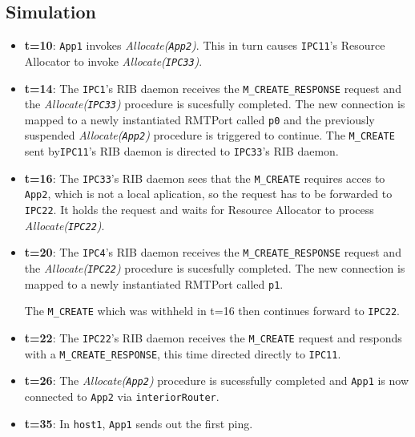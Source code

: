         \subsection{Simulation}

            \begin{itemize}
            \item \textbf{t=10}: \texttt{App1} invokes \emph{Allocate(\texttt{App2})}. This in turn causes \texttt{IPC11}'s Resource Allocator to invoke \emph{Allocate(\texttt{IPC33})}.

            \item \textbf{t=14}: The \texttt{IPC1}'s RIB daemon receives the \texttt{M\_CREATE\_RESPONSE} request and the \emph{Allocate(\texttt{IPC33})} procedure is sucesfully completed. The new connection is mapped to a newly instantiated RMTPort called \texttt{p0} and the previously suspended \emph{Allocate(\texttt{App2})} procedure is triggered to continue. The \texttt{M\_CREATE} sent by\texttt{IPC11}'s RIB daemon is directed to \texttt{IPC33}'s RIB daemon.

            \item \textbf{t=16}: The \texttt{IPC33}'s RIB daemon sees that the \texttt{M\_CREATE} requires acces to \texttt{App2}, which is not a local aplication, so the request has to be forwarded to \texttt{IPC22}. It holds the request and waits for Resource Allocator to process \emph{Allocate(\texttt{IPC22})}.

            \item \textbf{t=20}: The \texttt{IPC4}'s RIB daemon receives the \texttt{M\_CREATE\_RESPONSE} request and the \emph{Allocate(\texttt{IPC22})} procedure is sucesfully completed. The new connection is mapped to a newly instantiated RMTPort called \texttt{p1}.

            The \texttt{M\_CREATE} which was withheld in t=16 then continues forward to \texttt{IPC22}.

            \item \textbf{t=22}: The \texttt{IPC22}'s RIB daemon receives the \texttt{M\_CREATE} request and responds with a \texttt{M\_CREATE\_RESPONSE}, this time directed directly to \texttt{IPC11}.

            \item \textbf{t=26}: The \emph{Allocate(\texttt{App2})} procedure is sucessfully completed and \texttt{App1} is now connected to \texttt{App2} via \texttt{interiorRouter}.

            \item \textbf{t=35}: In \texttt{host1}, \texttt{App1} sends out the first ping.


\end{itemize}
